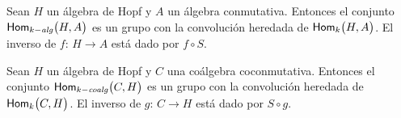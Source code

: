 \begin{teoGrupoDeMorfismos}\label{thm:grupodemorfismos}
	Sean $H$ un \'{a}lgebra de Hopf y $A$ un \'{a}lgebra conmutativa.
	Entonces el conjunto $\Homalg\big(H,A\big)$ es un grupo con la
	convoluci\'{o}n heredada de $\Hom[k]\big(H,A\big)$. El inverso de
	$f:\,H\rightarrow A$ est\'{a} dado por $f\circ S$.
\end{teoGrupoDeMorfismos}

\begin{teoGrupoDeMorfismos}\label{thm:grupodecomorfismos}
	Sean $H$ un \'{a}lgebra de Hopf y $C$ una co\'{a}lgebra coconmutativa.
	Entonces el conjunto $\Homcoalg\big(C,H\big)$ es un grupo con la
	convoluci\'{o}n heredada de $\Hom[k]\big(C,H\big)$. El inverso de
	$g:\,C\rightarrow H$ est\'{a} dado por $S\circ g$.
\end{teoGrupoDeMorfismos}

